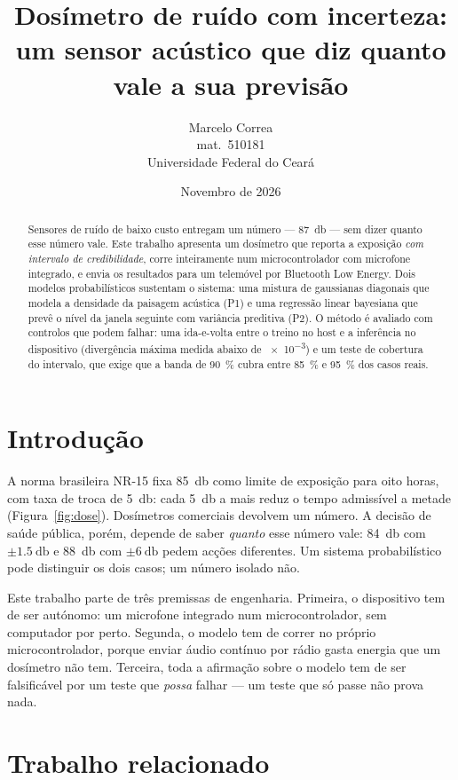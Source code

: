 \documentclass[10pt,a4paper]{article}
\title{Dosímetro de ruído com incerteza:\\ um sensor acústico que diz quanto vale a sua previsão}
\author{Marcelo Correa\\ \small mat.\ 510181\\ \small Universidade Federal do Ceará}
\date{Novembro de 2026}
\begin{document}
\maketitle

\begin{abstract}
Sensores de ruído de baixo custo entregam um número --- \SI{87}{\decibel} --- sem dizer
quanto esse número vale. Este trabalho apresenta um dosímetro que reporta a exposição
\emph{com intervalo de credibilidade}, corre inteiramente num microcontrolador com
microfone integrado, e envia os resultados para um telemóvel por Bluetooth Low Energy.
Dois modelos probabilísticos sustentam o sistema: uma mistura de gaussianas diagonais
que modela a densidade da paisagem acústica (P1) e uma regressão linear bayesiana que
prevê o nível da janela seguinte com variância preditiva (P2). O método é avaliado com
controlos que podem falhar: uma ida-e-volta entre o treino no host e a inferência no
dispositivo (divergência máxima medida abaixo de \num{e-3}) e um teste de cobertura do
intervalo, que exige que a banda de \SI{90}{\percent} cubra entre \SI{85}{\percent} e
\SI{95}{\percent} dos casos reais.
\end{abstract}

\section{Introdução}

A norma brasileira NR-15 fixa \SI{85}{\decibel} como limite de exposição para oito horas,
com taxa de troca de \SI{5}{\decibel}: cada \SI{5}{\decibel} a mais reduz o tempo admissível
a metade (Figura~\ref{fig:dose}). Dosímetros comerciais devolvem um número. A decisão de
saúde pública, porém, depende de saber \emph{quanto} esse número vale: \SI{84}{\decibel}
com $\pm\SI{1.5}{\decibel}$ e \SI{88}{\decibel} com $\pm\SI{6}{\decibel}$ pedem acções
diferentes. Um sistema probabilístico pode distinguir os dois casos; um número isolado não.

Este trabalho parte de três premissas de engenharia. Primeira, o dispositivo tem de ser
autónomo: um microfone integrado num microcontrolador, sem computador por perto. Segunda,
o modelo tem de correr no próprio microcontrolador, porque enviar áudio contínuo por rádio
gasta energia que um dosímetro não tem. Terceira, toda a afirmação sobre o modelo tem de ser
falsificável por um teste que \emph{possa} falhar --- um teste que só passe não prova nada.

\section{Trabalho relacionado}
\end{document}
